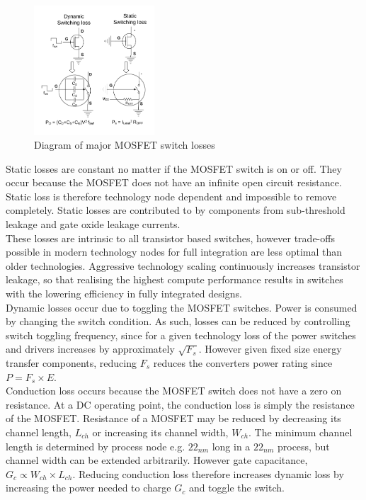 \documentclass[letterpaper,twocolumn,10pt]{article}
\begin{document}
\begin{figure}[here]
\includegraphics[width=0.4\textwidth]{SwitchLosses}
\caption{Diagram of major MOSFET switch losses}
\label{SWLosses}
\end{figure}

Static losses are constant no matter if the MOSFET switch is on or off. They occur because the MOSFET does not have an infinite open circuit resistance. Static loss is therefore technology node dependent and impossible to remove completely. Static losses are contributed to by components from sub-threshold leakage and gate oxide leakage currents.\\
These losses are intrinsic to all transistor based switches, however trade-offs possible in modern technology nodes for full integration are less optimal than older technologies. Aggressive technology scaling continuously increases transistor leakage\cite{Iwai2009}, so that realising the highest compute performance results in switches with the lowering efficiency in fully integrated designs.\\
Dynamic losses occur due to toggling the MOSFET switches. Power is consumed by changing the switch condition. As such, losses can be reduced by controlling switch toggling frequency, since for a given technology loss of the power switches and drivers increases by approximately $\sqrt{F_s}$\cite{Andreou1999}. However given fixed size energy transfer components, reducing $F_s$ reduces the converters power rating since $P = F_s \times E$.\\
Conduction loss occurs because the MOSFET switch does not have a zero on resistance. At a DC operating point, the conduction loss is simply the resistance of the MOSFET. Resistance of a MOSFET may be reduced by decreasing its channel length, $L_{ch}$ or increasing its channel width, $W_{ch}$. The minimum channel length is determined by process node e.g. $22_{nm}$ long in a $22_{nm}$ process, but channel width can be extended arbitrarily. However gate capacitance, $G_c \propto W_{ch} \times L_{ch}$. Reducing conduction loss therefore increases dynamic loss by increasing the power needed to charge $G_c$ and toggle the switch.\\  
\end{document}

